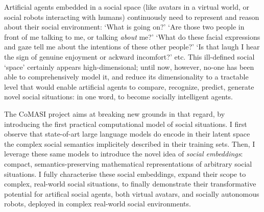 \documentclass[11pt,a4paper]{report}
\newcommand{\project}{CoMASI\xspace}
\begin{document}


Artificial agents embedded in a social space (like avatars in a virtual world,
or social robots interacting with humans) continuously need to represent and
reason about their social environment: `What is going on?' `Are those two people
in front of me talking to me, or talking \emph{about} me?' `What do these facial
expressions and gaze tell me about the intentions of these other people?' `Is
that laugh I hear the sign of genuine enjoyment or ackward incomfort?' etc. This
ill-defined social `space' certainly appears high-dimensional; until now,
however, no-one has been able to comprehensively model it, and reduce its dimensionality
to a tractable level that would enable artificial agents to compare, recognize,
predict, generate novel social situations: in one word, to become socially
intelligent agents.

The \project project aims at breaking new grounds in that regard, by introducing the first
practical computational model of social situations. I first observe that
state-of-art large language models do encode in their latent space the complex
social semantics implicitely described in their training sets. Then, I leverage
these same models to introduce the novel idea of \emph{social embeddings}:
compact, semantics-preserving mathematical representations of arbitrary social
situations. I fully characterise these social embeddings, expand their
scope to complex, real-world social situations, to finally demonstrate their
transformative potential for artifical social agents, both virtual avatars,
and socially autonomous robots, deployed in complex real-world social
environments.
\end{document}
